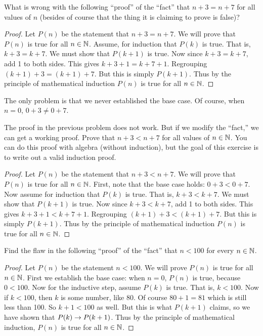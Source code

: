 \begin{questions}
	
	


\question What is wrong with the following ``proof'' of the ``fact'' that $n+3 = n+7$ for all values of $n$ (besides of course that the thing it is claiming to prove is false)? 
  \begin{proof}
    Let $P(n)$ be the statement that $n + 3 = n + 7$.  We will prove that $P(n)$ is true for all $n \in \mathbb N$.  Assume, for induction that $P(k)$ is true.  That is, $k+3 = k+7$.  We must show that $P(k+1)$ is true.  Now since $k + 3 = k + 7$, add 1 to both sides.  This gives $k + 3 + 1 = k + 7 + 1$.  Regrouping $(k+1) + 3 = (k+1) + 7$.  But this is simply $P(k+1)$.  Thus by the principle of mathematical induction $P(n)$ is true for all $n \in \mathbb N$.
  \end{proof}
  
  	\begin{answer}
  		The only problem is that we never established the base case.  Of course, when $n = 0$, $0+3 \ne 0+7$.
  	\end{answer}
  	
  	
  	
  

\question The proof in the previous problem does not work.  But if we modify the ``fact,'' we can get a working proof.  Prove that $n + 3 < n + 7$ for all values of $n \in \mathbb N$.  You can do this proof with algebra (without induction), but the goal of this exercise is to write out a valid induction proof.

	\begin{answer}
		\begin{proof}
		    Let $P(n)$ be the statement that $n + 3 < n + 7$.  We will prove that $P(n)$ is true for all $n \in \mathbb N$.  First, note that the base case holds: $0+3 < 0+7$.  Now assume for induction that $P(k)$ is true.  That is, $k+3 < k+7$.  We must show that $P(k+1)$ is true.  Now since $k + 3 < k + 7$, add 1 to both sides.  This gives $k + 3 + 1 < k + 7 + 1$.  Regrouping $(k+1) + 3 < (k+1) + 7$.  But this is simply $P(k+1)$.  Thus by the principle of mathematical induction $P(n)$ is true for all $n \in \mathbb N$.
		\end{proof}
	\end{answer}
	
	
	

  
\question  Find the flaw in the following ``proof'' of the ``fact'' that $n < 100$ for every $n \in \mathbb N$.
 \begin{proof}
  Let $P(n)$ be the statement $n < 100$.  We will prove $P(n)$ is true for all $n \in \mathbb N$. First we establish the base case: when $n = 0$, $P(n)$ is true, because $0 < 100$.  Now for the inductive step, assume $P(k)$ is true.  That is, $k < 100$.  Now if $k < 100$, then $k$ is some number, like 80.  Of course $80+1 = 81$ which is still less than 100.  So $k +1 < 100$ as well.  But this is what $P(k+1)$ claims, so we have shown that $P(k) \rightarrow P(k+1)$.  Thus by the principle of mathematical induction, $P(n)$ is true for all $n \in \mathbb N$.
 \end{proof}
 

\end{questions}
